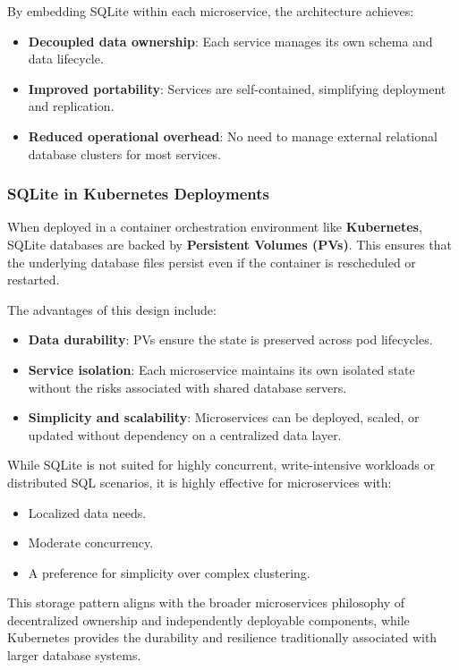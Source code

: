 By embedding SQLite within each microservice, the architecture achieves:
\begin{itemize}
    \item \textbf{Decoupled data ownership}: Each service manages its own schema and data lifecycle.
    \item \textbf{Improved portability}: Services are self-contained, simplifying deployment and replication.
    \item \textbf{Reduced operational overhead}: No need to manage external relational database clusters for most services.
\end{itemize}

\subsubsection{SQLite in Kubernetes Deployments}

When deployed in a container orchestration environment like \textbf{Kubernetes}, SQLite databases are backed by \textbf{Persistent Volumes (PVs)}. This ensures that the underlying database files persist even if the container is rescheduled or restarted.

The advantages of this design include:
\begin{itemize}
    \item \textbf{Data durability}: PVs ensure the state is preserved across pod lifecycles.
    \item \textbf{Service isolation}: Each microservice maintains its own isolated state without the risks associated with shared database servers.
    \item \textbf{Simplicity and scalability}: Microservices can be deployed, scaled, or updated without dependency on a centralized data layer.
\end{itemize}

While SQLite is not suited for highly concurrent, write-intensive workloads or distributed SQL scenarios, it is highly effective for microservices with:
\begin{itemize}
    \item Localized data needs.
    \item Moderate concurrency.
    \item A preference for simplicity over complex clustering.
\end{itemize}

This storage pattern aligns with the broader microservices philosophy of decentralized ownership and independently deployable components, while Kubernetes provides the durability and resilience traditionally associated with larger database systems.
\newpage

